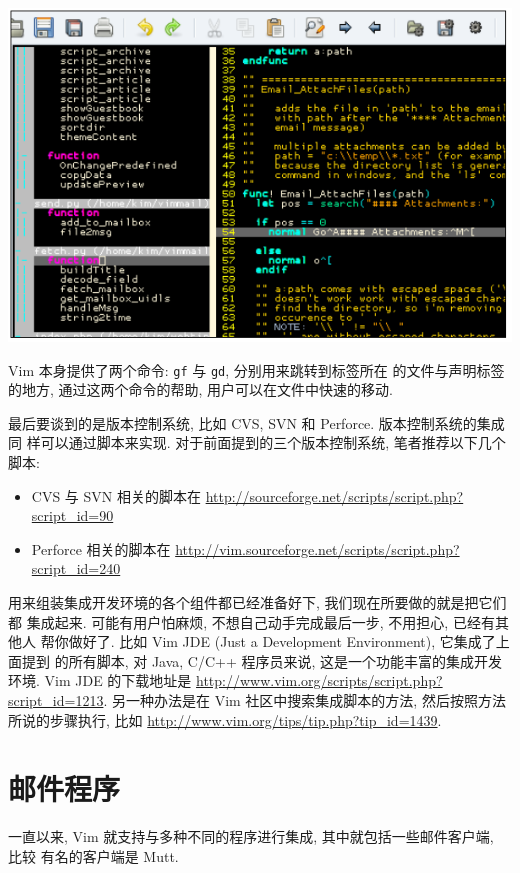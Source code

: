\begin{center}
    \includegraphics[scale=0.6]{./images/page209.png}
\end{center}
Vim 本身提供了两个命令: \texttt{gf} 与 \texttt{gd}, 分别用来跳转到标签所在
的文件与声明标签的地方, 通过这两个命令的帮助, 用户可以在文件中快速的移动.

最后要谈到的是版本控制系统, 比如 CVS, SVN 和 Perforce. 版本控制系统的集成同
样可以通过脚本来实现. 对于前面提到的三个版本控制系统, 笔者推荐以下几个脚本:
\begin{itemize}
    \item CVS 与 SVN 相关的脚本在
        \url{http://sourceforge.net/scripts/script.php?script_id=90}
    \item Perforce 相关的脚本在
        \url{http://vim.sourceforge.net/scripts/script.php?script_id=240}
\end{itemize}

用来组装集成开发环境的各个组件都已经准备好下, 我们现在所要做的就是把它们都
集成起来. 可能有用户怕麻烦, 不想自己动手完成最后一步, 不用担心, 已经有其他人
帮你做好了. 比如 Vim JDE (Just a Development Environment), 它集成了上面提到
的所有脚本, 对 Java, C/C++ 程序员来说, 这是一个功能丰富的集成开发环境. Vim JDE
的下载地址是 \url{http://www.vim.org/scripts/script.php?script_id=1213}.
另一种办法是在 Vim 社区中搜索集成脚本的方法, 然后按照方法所说的步骤执行,
比如 \url{http://www.vim.org/tips/tip.php?tip_id=1439}.

\section{邮件程序}
\label{sec:mail_program}

一直以来, Vim 就支持与多种不同的程序进行集成, 其中就包括一些邮件客户端, 比较
有名的客户端是 Mutt.


